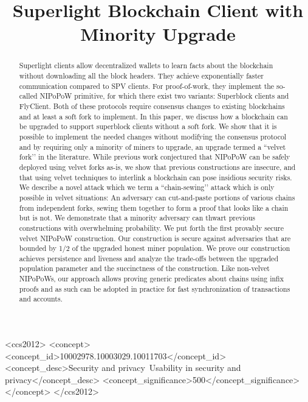 \documentclass[sigconf, anonymous]{acmart}
\theoremstyle{plain}
\theoremstyle{definition}
\begin{document}
\title{Superlight Blockchain Client with Minority Upgrade} %

\begin{abstract}
Superlight clients allow decentralized wallets to learn facts about the blockchain without downloading all the block headers. They achieve exponentially faster communication compared to SPV clients. For proof-of-work, they implement the so-called NIPoPoW primitive, for which there exist two variants: Superblock clients and FlyClient. Both of these protocols require consensus changes to existing blockchains and at least a soft fork to implement. In this paper, we discuss how a blockchain can be upgraded to support superblock clients without a soft fork. We show that it is possible to implement the needed changes without modifying the consensus protocol and by requiring only a minority of miners to upgrade, an upgrade termed a ``velvet fork’' in the literature. While previous work conjectured that NIPoPoW can be safely deployed using velvet forks as-is, we show that previous constructions are insecure, and that using velvet techniques to interlink a blockchain can pose insidious security risks. We describe a novel attack which we term a ``chain-sewing’' attack which is only possible in velvet situations: An adversary can cut-and-paste portions of various chains from independent forks, sewing them together to form a proof that looks like a chain but is not. We demonstrate that a minority adversary can thwart previous constructions with overwhelming probability. We put forth the first provably secure velvet NIPoPoW construction. Our construction is secure against adversaries that are bounded by 1/2 of the upgraded honest miner population. We prove our construction achieves persistence and liveness and analyze the trade-offs between the upgraded population parameter and the succinctness of the construction. Like non-velvet NIPoPoWs, our approach allows proving generic predicates about chains using infix proofs and as such can be adopted in practice for fast synchronization of transactions and accounts.
\end{abstract}

\begin{CCSXML}
<ccs2012>
<concept>
<concept_id>10002978.10003029.10011703</concept_id>
<concept_desc>Security and privacy~Usability in security and privacy</concept_desc>
<concept_significance>500</concept_significance>
</concept>
</ccs2012>
\end{CCSXML}



\maketitle




\end{document}
